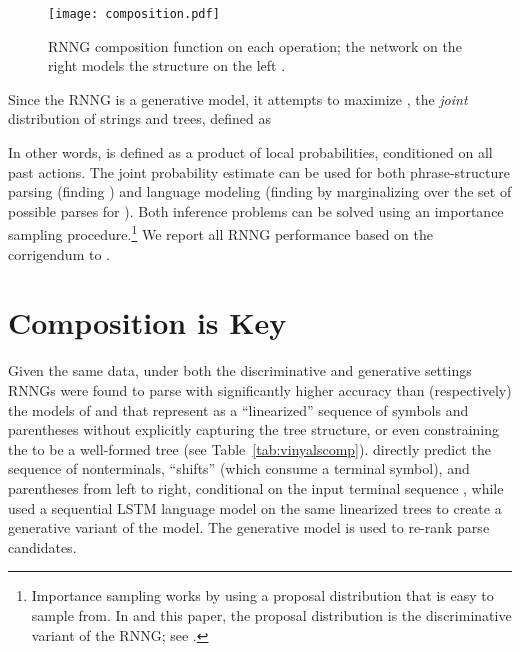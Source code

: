 \documentclass[11pt]{article}
\newcommand{\ignore}[1]{}
\newcommand{\nascomment}[1]{\textcolor{blue}{{\textbf{[#1 --\textsc{nas}]}}}}
\newcommand{\miguelcomment}[1]{\textcolor{red}{{\textbf{[#1 --\textsc{miguel}]}}}}
\renewcommand{\nascomment}[1]{}
\renewcommand{\miguelcomment}[1]{}
\begin{document}
\begin{figure}[h]
\centering
\texttt{[image: composition.pdf]}
\vspace{-1.3cm}
\caption{RNNG composition function on each  operation; the network on the right models the structure on the left \cite{rnng}.}
\label{fig:composition}
\end{figure}


Since the RNNG is a generative model, it attempts to maximize , the \emph{joint} distribution of strings and trees, defined as

In other words,  is defined as a product of local probabilities, conditioned on all past actions. The joint probability estimate  can be used for both phrase-structure parsing (finding )  and language modeling (finding  by marginalizing over the set of possible parses for ).  Both inference problems can be solved using an importance sampling procedure.\footnote{Importance sampling works by using a proposal distribution  that is easy to sample from. In  and this paper, the proposal distribution is the discriminative variant of the RNNG; see .} We report all RNNG performance based on the corrigendum to .

\ignore{\miguelcomment{I think sect. 2 is too long, we have already published a paper with that info. If you want to do it like this, you should add some discussion about the things that you want to study/change in this paper... research questions,etc.}
\nascomment{disagree.  section 1 is way too long -- coming back to that later.  section 2 needs to make the paper self-contained since our contributions rely on digging into the model details}\miguelcomment{True. I "ignored" both comments}}

\section{Composition is Key}\label{sec:composition_analysis}

Given the same data, under both the discriminative and generative settings
 RNNGs were found to parse with significantly higher accuracy than (respectively) the models of  and  that represent  as a ``linearized'' sequence of symbols and parentheses without explicitly capturing the tree structure, or even constraining the  to be a well-formed tree (see Table~\ref{tab:vinyalscomp}).  directly predict the sequence of nonterminals, ``shifts'' (which consume a terminal symbol), and parentheses from left to right, conditional on the input terminal sequence , while  used a sequential LSTM language model on the same linearized trees to create a generative variant of the  model. The generative model is used to re-rank parse candidates.
\end{document}
